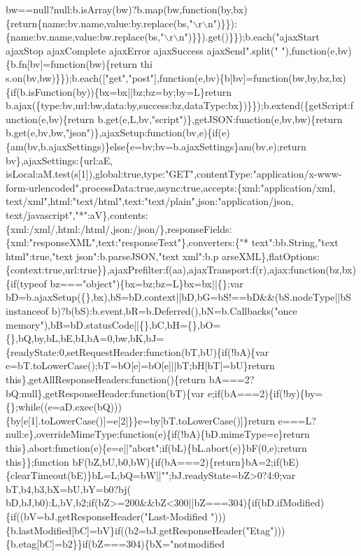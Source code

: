\begin{DoxyCode}
{{       bw==null?null:b.isArray(bw)?b.map(bw,function(by,bx)\{return\{name:bv.name,value:by.replace(bs,"\(\backslash\)r\(\backslash\)n")\}\}):\{name:bv.name,value:bw.replace(bs,"\(\backslash\)r\(\backslash\)n")\}\}).get()\}\});b.each("ajaxStart
       ajaxStop ajaxComplete ajaxError ajaxSuccess ajaxSend".split(" "),function(e,bv)\{b.fn[bv]=function(bw)\{return
       thi
      s.on(bv,bw)\}\});b.each(["get","post"],function(e,bv)\{b[bv]=function(bw,by,bz,bx)\{if(b.isFunction(by))\{bx=bx||bz;bz=by;by=L\}return
       b.ajax(\{type:bv,url:bw,data:by,success:bz,dataType:bx\})\}\});b.extend(\{getScript:function(e,bv)\{return b.get(e,L,bv,"script")\},getJSON:function(e,bv,bw)\{return
       b.get(e,bv,bw,"json")\},ajaxSetup:function(bv,e)\{if(e)\{am(bv,b.ajaxSettings)\}else\{e=bv;bv=b.ajaxSettings\}am(bv,e);return
       bv\},ajaxSettings:\{url:aE,
      isLocal:aM.test(s[1]),global:true,type:"GET",contentType:"application/x-www-form-urlencoded",processData:true,async:true,accepts:\{xml:"application/xml,
       text/xml",html:"text/html",text:"text/plain",json:"application/json,
       text/javascript","*":aV\},contents:\{xml:/xml/,html:/html/,json:/json/\},responseFields:\{xml:"responseXML",text:"responseText"\},converters:\{"* text":bb.String,"text html":true,"text json":b.parseJSON,"text
       xml":b.p
      arseXML\},flatOptions:\{context:true,url:true\}\},ajaxPrefilter:f(aa),ajaxTransport:f(r),ajax:function(bz,bx)\{if(typeof bz==="object")\{bx=bz;bz=L\}bx=bx||\{\};var
       bD=b.ajaxSetup(\{\},bx),bS=bD.context||bD,bG=bS!==bD&&(bS.nodeType||bS instanceof b)?b(bS):b.event,bR=b.Deferred(),bN=b.Callbacks("once
       memory"),bB=bD.statusCode||\{\},bC,bH=\{\},bO=\{\},bQ,by,bL,bE,bI,bA=0,bw,bK,bJ=\{readyState:0,setRequestHeader:function(bT,bU)\{if(!bA)\{var
       e=bT.toLowerCase();bT=bO[e]=bO[e]||bT;bH[bT]=bU\}return this\},getAllResponseHeaders:function()\{return
       bA===2?bQ:null\},getResponseHeader:function(bT)\{var
       e;if(bA===2)\{if(!by)\{by=\{\};while((e=aD.exec(bQ)))\{by[e[1].toLowerCase()]=e[2]\}\}e=by[bT.toLowerCase()]\}return e===L?null:e\},overrideMimeType:function(e)\{if(!bA)\{bD.mimeType=e\}return
       this\},abort:function(e)\{e=e||"abort";if(bL)\{bL.abort(e)\}bF(0,e);return this\}\};function
       bF(bZ,bU,b0,bW)\{if(bA===2)\{return\}bA=2;if(bE)\{clearTimeout(bE)\}bL=L;bQ=bW||"";bJ.readyState=bZ>0?4:0;var
       bT,b4,b3,bX=bU,bY=b0?bj(
      bD,bJ,b0):L,bV,b2;if(bZ>=200&&bZ<300||bZ===304)\{if(bD.ifModified)\{if((bV=bJ.getResponseHeader("Last-Modified
      ")))\{b.lastModified[bC]=bV\}if((b2=bJ.getResponseHeader("Etag")))\{b.etag[bC]=b2\}\}if(bZ===304)\{bX="notmodified
}}
\end{DoxyCode}
